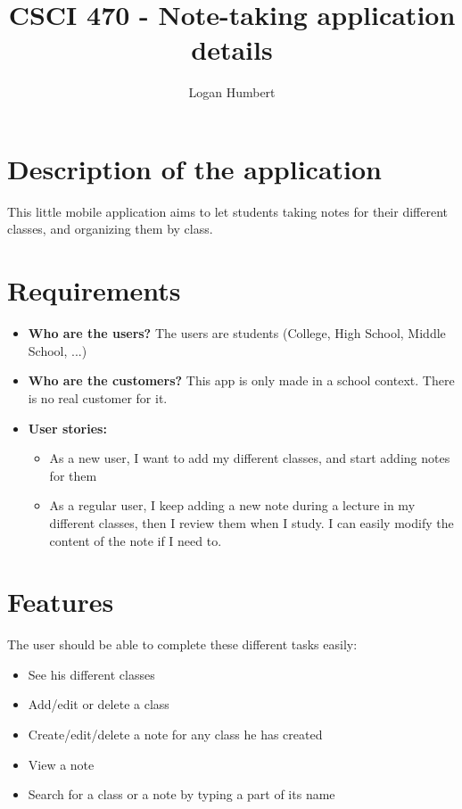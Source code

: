 \documentclass[]{article}
\title{CSCI 470 - Note-taking application details}
\author{Logan Humbert}
\begin{document}
	
	\maketitle
	
	\pagebreak
	
	\section{Description of the application}
	
	This little mobile application aims to let students taking notes for their different classes, and organizing them by class.
	
	\section{Requirements}
	
	\begin{itemize}
		\item \textbf{Who are the users? } The users are students (College, High School, Middle School, ...)
		
		\item \textbf{Who are the customers?} This app is only made in a school context. There is no real customer for it.
		
		\item  \textbf{User stories:}
			\begin{itemize}
				\item As a new user, I want to add my different classes, and start adding notes for them
				
				\item  As a regular user, I keep adding a new note during a lecture in my different classes, then I review them when I study.
				I can easily modify the content of the note if I need to.
			\end{itemize}
		
	\end{itemize}
	
	\section{Features}
	
	The user should be able to complete these different tasks easily:
	
	\begin{itemize}
		\item See his different classes
		\item Add/edit or delete a class
		\item Create/edit/delete a note for any class he has created
		\item View a note
		\item  Search for a class or a note by typing a part of its name
	\end{itemize}
	
\end{document}
